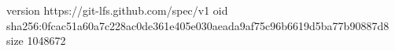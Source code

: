 version https://git-lfs.github.com/spec/v1
oid sha256:0fcac51a60a7c228ac0de361e405e030aeada9af75c96b6619d5ba77b90887d8
size 1048672
